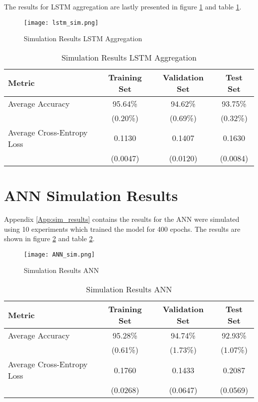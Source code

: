   \noindent The results for LSTM aggregation are lastly presented in figure
  \ref{fig:lstm_sim} and table \ref{table:lstm_sim}. 

  \begin{figure}
		\centering
		\texttt{[image: lstm\_sim.png]}
		\caption{Simulation Results LSTM Aggregation}
        \label{fig:lstm_sim}
  \end{figure}

  \begin{table}
    \centering
      \begin{tabular}{|l||c|c|c|}
      \hline
      \textbf{Metric} & \textbf{Training Set} & \textbf{Validation Set} & 
      \textbf{Test Set}\\
      \hline\hline
      Average Accuracy & 95.64\% & 94.62\% & 93.75\% \\\hline 
                       & (0.20\%) & (0.69\%) & (0.32\%) \\\hline
      Average Cross-Entropy Loss & 0.1130 & 0.1407 & 0.1630 \\\hline
                                 & (0.0047) & (0.0120) & (0.0084) \\
      \hline
    \end{tabular}
    \caption{Simulation Results LSTM Aggregation}
    \label{table:lstm_sim}
  \end{table}

  \section[ANN Simulations]{ANN Simulation Results}
  \label{App:ann_sim}

  Appendix \ref{App:sim_results} contains the results for the ANN were simulated 
  using 10 experiments which trained the model for 400 epochs. The results are 
  shown in figure \ref{fig:ann_sim} and table \ref{table:ann_sim}. 

  \begin{figure}
		\centering
		\texttt{[image: ANN\_sim.png]}
		\caption{Simulation Results ANN}
        \label{fig:ann_sim}
  \end{figure}

  \begin{table}[h]
    \centering
      \begin{tabular}{|l||c|c|c|}
      \hline
      \textbf{Metric} & \textbf{Training Set} & \textbf{Validation Set} & 
      \textbf{Test Set}\\
      \hline\hline
      Average Accuracy & 95.28\% & 94.74\% & 92.93\% \\\hline 
                       & (0.61\%) & (1.73\%) & (1.07\%) \\\hline
      Average Cross-Entropy Loss & 0.1760 & 0.1433 & 0.2087 \\\hline
                                 & (0.0268) & (0.0647) & (0.0569) \\
      \hline
    \end{tabular}
    \caption{Simulation Results ANN}
    \label{table:ann_sim}
  \end{table}
